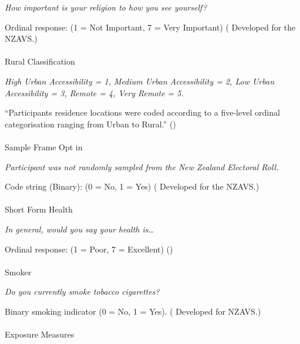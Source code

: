\documentclass[
  single column]{article}
\makeatletter
\let\oldparagraph\paragraph
\renewcommand{\paragraph}{
    \@ifstar
      \xxxParagraphStar
      \xxxParagraphNoStar
  }
\newcommand{\xxxParagraphStar}[1]{\oldparagraph*{#1}\mbox{}}
\newcommand{\xxxParagraphNoStar}[1]{\oldparagraph{#1}\mbox{}}
\makeatother
\begin{document}
\emph{How important is your religion to how you see yourself?}

Ordinal response: (1 = Not Important, 7 = Very Important)
( Developed for the
NZAVS.)

\paragraph{Rural Classification}\label{rural-classification}

\emph{High Urban Accessibility = 1, Medium Urban Accessibility = 2, Low
Urban Accessibility = 3, Remote = 4, Very Remote = 5.}

``Participants residence locations were coded according to a five-level
ordinal categorisation ranging from Urban to Rural.''
()

\paragraph{Sample Frame Opt in}\label{sample-frame-opt-in}

\emph{Participant was not randomly sampled from the New Zealand
Electoral Roll.}

Code string (Binary): (0 = No, 1 = Yes)
( Developed for the
NZAVS.)

\paragraph{Short Form Health}\label{short-form-health}

\emph{In general, would you say your health is\ldots{}}

Ordinal response: (1 = Poor, 7 = Excellent)
()

\paragraph{Smoker}\label{smoker}

\emph{Do you currently smoke tobacco cigarettes?}

Binary smoking indicator (0 = No, 1 = Yes).
( Developed for NZAVS.)

\paragraph{Exposure Measures}\label{exposure-measures}
\end{document}
